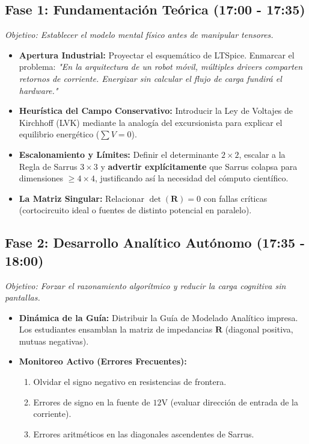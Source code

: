 \documentclass[11pt,a4paper]{article}
\begin{document}
\subsection*{Fase 1: Fundamentación Teórica (17:00 - 17:35)}
\textit{Objetivo: Establecer el modelo mental físico antes de manipular tensores.}
\begin{itemize}
    \item \textbf{Apertura Industrial:} Proyectar el esquemático de LTSpice. Enmarcar el problema: \textit{"En la arquitectura de un robot móvil, múltiples drivers comparten retornos de corriente. Energizar sin calcular el flujo de carga fundirá el hardware."}
    \item \textbf{Heurística del Campo Conservativo:} Introducir la Ley de Voltajes de Kirchhoff (LVK) mediante la analogía del excursionista para explicar el equilibrio energético ($\sum V = 0$).
    \item \textbf{Escalonamiento y Límites:} Definir el determinante $2\times2$, escalar a la Regla de Sarrus $3\times3$ y \textbf{advertir explícitamente} que Sarrus colapsa para dimensiones $\ge 4\times4$, justificando así la necesidad del cómputo científico.
    \item \textbf{La Matriz Singular:} Relacionar $\det(\mathbf{R}) = 0$ con fallas críticas (cortocircuito ideal o fuentes de distinto potencial en paralelo).
\end{itemize}

\subsection*{Fase 2: Desarrollo Analítico Autónomo (17:35 - 18:00)}
\textit{Objetivo: Forzar el razonamiento algorítmico y reducir la carga cognitiva sin pantallas.}
\begin{itemize}
    \item \textbf{Dinámica de la Guía:} Distribuir la Guía de Modelado Analítico impresa. Los estudiantes ensamblan la matriz de impedancias $\mathbf{R}$ (diagonal positiva, mutuas negativas).
    \item \textbf{Monitoreo Activo (Errores Frecuentes):} 
    \begin{enumerate}
        \item Olvidar el signo negativo en resistencias de frontera.
        \item Errores de signo en la fuente de $12\text{V}$ (evaluar dirección de entrada de la corriente).
        \item Errores aritméticos en las diagonales ascendentes de Sarrus.
    \end{enumerate}
\end{itemize}
\end{document}

